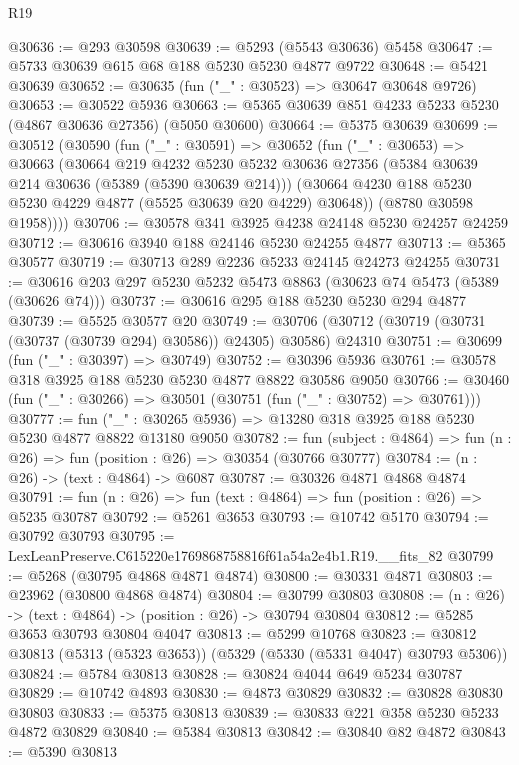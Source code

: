 \begin{lexlean}{R19}
\begin{coremodule}
@30636 := @293 @30598
@30639 := @5293 (@5543 @30636) @5458
@30647 := @5733 @30639 @615 @68 @188 @5230 @5230 @4877 @9722
@30648 := @5421 @30639
@30652 := @30635 (fun ("_" : @30523) => @30647 @30648 @9726)
@30653 := @30522 @5936
@30663 := @5365 @30639 @851 @4233 @5233 @5230 (@4867 @30636 @27356) (@5050 @30600)
@30664 := @5375 @30639
@30699 := @30512
    (@30590
      (fun ("_" : @30591) =>
      @30652
        (fun ("_" : @30653) =>
        @30663
          (@30664
            @219
            @4232
            @5230
            @5232
            @30636
            @27356
            (@5384 @30639 @214 @30636 (@5389 (@5390 @30639 @214)))
            (@30664 @4230 @188 @5230 @5230 @4229 @4877 (@5525 @30639 @20 @4229) @30648))
          (@8780 @30598 @1958))))
@30706 := @30578 @341 @3925 @4238 @24148 @5230 @24257 @24259
@30712 := @30616 @3940 @188 @24146 @5230 @24255 @4877
@30713 := @5365 @30577
@30719 := @30713 @289 @2236 @5233 @24145 @24273 @24255
@30731 := @30616 @203 @297 @5230 @5232 @5473 @8863 (@30623 @74 @5473 (@5389 (@30626 @74)))
@30737 := @30616 @295 @188 @5230 @5230 @294 @4877
@30739 := @5525 @30577 @20
@30749 := @30706 (@30712 (@30719 (@30731 (@30737 (@30739 @294) @30586)) @24305) @30586) @24310
@30751 := @30699 (fun ("_" : @30397) => @30749)
@30752 := @30396 @5936
@30761 := @30578 @318 @3925 @188 @5230 @5230 @4877 @8822 @30586 @9050
@30766 := @30460 (fun ("_" : @30266) => @30501 (@30751 (fun ("_" : @30752) => @30761)))
@30777 := fun ("_" : @30265 @5936) => @13280 @318 @3925 @188 @5230 @5230 @4877 @8822 @13180 @9050
@30782 := fun (subject : @4864) => fun (n : @26) => fun (position : @26) => @30354 (@30766 @30777)
@30784 := (n : @26) -> (text : @4864) -> @6087
@30787 := @30326 @4871 @4868 @4874
@30791 := fun (n : @26) => fun (text : @4864) => fun (position : @26) => @5235 @30787
@30792 := @5261 @3653
@30793 := @10742 @5170
@30794 := @30792 @30793
@30795 := LexLeanPreserve.C615220e1769868758816f61a54a2e4b1.R19.__fits_82
@30799 := @5268 (@30795 @4868 @4871 @4874)
@30800 := @30331 @4871
@30803 := @23962 (@30800 @4868 @4874)
@30804 := @30799 @30803
@30808 := (n : @26) -> (text : @4864) -> (position : @26) -> @30794 @30804
@30812 := @5285 @3653 @30793 @30804 @4047
@30813 := @5299 @10768
@30823 := @30812 @30813 (@5313 (@5323 @3653)) (@5329 (@5330 (@5331 @4047) @30793 @5306))
@30824 := @5784 @30813
@30828 := @30824 @4044 @649 @5234 @30787
@30829 := @10742 @4893
@30830 := @4873 @30829
@30832 := @30828 @30830 @30803
@30833 := @5375 @30813
@30839 := @30833 @221 @358 @5230 @5233 @4872 @30829
@30840 := @5384 @30813
@30842 := @30840 @82 @4872
@30843 := @5390 @30813

\end{coremodule}
\end{lexlean}
